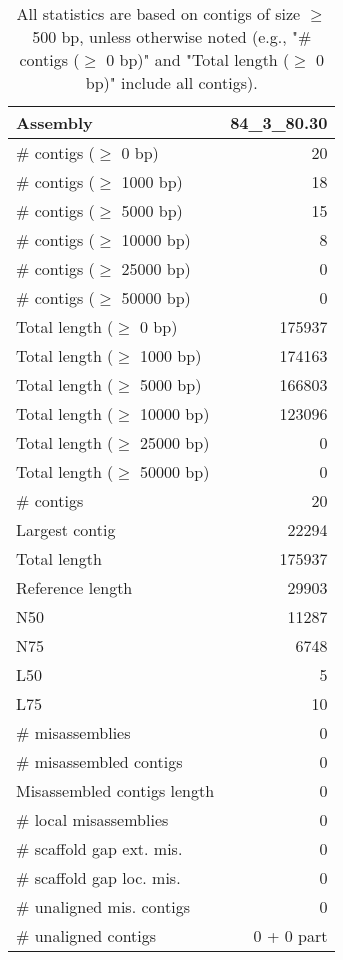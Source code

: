 \documentclass[12pt,a4paper]{article}
\begin{document}
\begin{table}[ht]
\begin{center}
\caption{All statistics are based on contigs of size $\geq$ 500 bp, unless otherwise noted (e.g., "\# contigs ($\geq$ 0 bp)" and "Total length ($\geq$ 0 bp)" include all contigs).}
\begin{tabular}{|l*{1}{|r}|}
\hline
Assembly & 84\_3\_80.30 \\ \hline
\# contigs ($\geq$ 0 bp) & 20 \\ \hline
\# contigs ($\geq$ 1000 bp) & 18 \\ \hline
\# contigs ($\geq$ 5000 bp) & 15 \\ \hline
\# contigs ($\geq$ 10000 bp) & 8 \\ \hline
\# contigs ($\geq$ 25000 bp) & 0 \\ \hline
\# contigs ($\geq$ 50000 bp) & 0 \\ \hline
Total length ($\geq$ 0 bp) & 175937 \\ \hline
Total length ($\geq$ 1000 bp) & 174163 \\ \hline
Total length ($\geq$ 5000 bp) & 166803 \\ \hline
Total length ($\geq$ 10000 bp) & 123096 \\ \hline
Total length ($\geq$ 25000 bp) & 0 \\ \hline
Total length ($\geq$ 50000 bp) & 0 \\ \hline
\# contigs & 20 \\ \hline
Largest contig & 22294 \\ \hline
Total length & 175937 \\ \hline
Reference length & 29903 \\ \hline
N50 & 11287 \\ \hline
N75 & 6748 \\ \hline
L50 & 5 \\ \hline
L75 & 10 \\ \hline
\# misassemblies & 0 \\ \hline
\# misassembled contigs & 0 \\ \hline
Misassembled contigs length & 0 \\ \hline
\# local misassemblies & 0 \\ \hline
\# scaffold gap ext. mis. & 0 \\ \hline
\# scaffold gap loc. mis. & 0 \\ \hline
\# unaligned mis. contigs & 0 \\ \hline
\# unaligned contigs & 0 + 0 part \\ \hline

\end{tabular}
\end{center}
\end{table}
\end{document}
